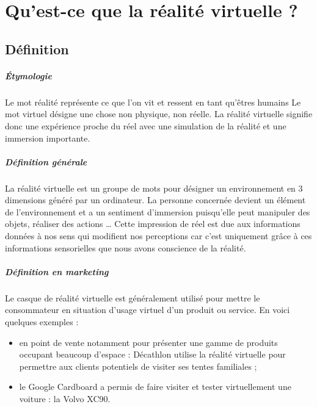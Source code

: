\documentclass[12pt, a4paper]{report}
\begin{document}
\chapter[Réalité virtuelle]{Qu'est-ce que la réalité virtuelle ?}

\section{Définition}

\paragraph{\'{E}tymologie}
Le mot réalité représente ce que l'on vit et ressent en tant qu'êtres humains
Le mot virtuel désigne une chose non physique, non réelle.
La réalité virtuelle signifie donc une expérience proche du réel avec une simulation de la réalité et une immersion importante.

\paragraph{Définition générale}
La réalité virtuelle est un groupe de mots pour désigner un environnement en 3 dimensions généré par un ordinateur. La personne concernée devient un élément de l'environnement et a un sentiment d'immersion puisqu'elle peut manipuler des objets, réaliser des actions \ldots{}
Cette impression de réel est due aux informations données à nos sens qui modifient nos perceptions car c'est uniquement grâce à ces informations sensorielles que nous avons conscience de la réalité.

\paragraph{Définition en marketing} Le casque de réalité virtuelle est généralement utilisé pour mettre le consommateur en situation d'usage virtuel d'un produit ou service. En voici quelques exemples :
\begin{itemize}
\item en point de vente notamment pour présenter une gamme de produits occupant beaucoup d'espace : Décathlon utilise la réalité virtuelle pour permettre aux clients potentiels de visiter ses tentes familiales ;

\item le Google Cardboard a permis de faire visiter et tester virtuellement une voiture : la Volvo XC90.
\end{itemize}
\end{document}
